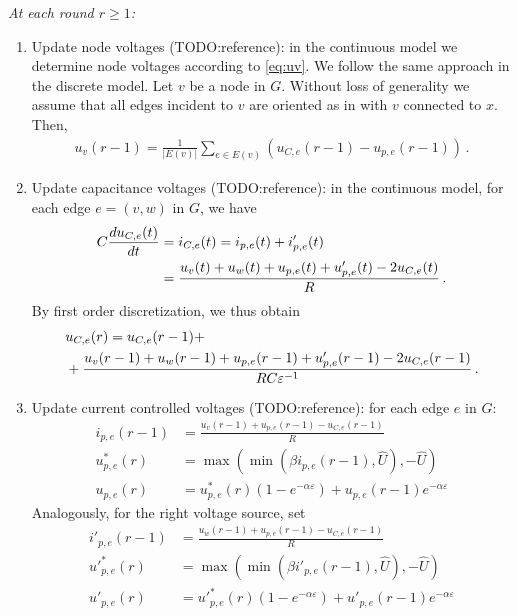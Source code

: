 \noindent
{\em At each round $r \ge 1$:}
\begin{enumerate}
\item Update node voltages (TODO:reference): in the continuous model we determine node voltages according to \eqref{eq:uv}.
We follow the same approach in the discrete model.
Let $v$ be a node in $G$. Without loss of generality we assume that all edges incident to $v$ are oriented as in  with $v$ connected to $x$.
Then,
\begin{align}
u_v(r-1) = \frac{1}{|E(v)|}\sum_{e \in E(v)}(u_{C,e}(r-1)-u_{p,e}(r-1))\,.\label{eq:dis:u}
\end{align}

\item Update capacitance voltages (TODO:reference): in the continuous model, for each edge $e=(v,w)$ in $G$, we have
\begin{align}
  C\frac{d u_{C,e}(t)}{dt} &= i_{C,e}(t) = i_{p,e}(t) + i'_{p,e}(t)\notag\\
  &= \frac{u_v(t)+u_w(t)+u_{p,e}(t)+u'_{p,e}(t)-2u_{C,e}(t)}{R}\,.
\end{align}
By first order discretization, we thus obtain
\begin{align}
  &u_{C,e}(r) = u_{C,e}(r-1) +\notag\\
  &+\frac{u_v(r-1)+u_w(r-1)+u_{p,e}(r-1)+u'_{p,e}(r-1)-2u_{C,e}(r-1)}{RC\varepsilon^{-1}}\,.\label{eq:dis:uC}
\end{align}

\item Update current controlled voltages (TODO:reference): for each edge $e$ in $G$:
\begin{align}
i_{p,e}(r-1) &= \frac{u_v(r-1)+u_{p,e}(r-1)-u_{C,e}(r-1)}{R}\\  
u^*_{p,e}(r) &= \max(\min(\beta i_{p,e}(r-1),\hat{U}),-\hat{U})\\
u_{p,e}(r)   &= u^*_{p,e}(r)(1-e^{-\alpha \varepsilon})+ u_{p,e}(r-1)e^{-\alpha \varepsilon}
\end{align}
Analogously, for the right voltage source, set
\begin{align}
i'_{p,e}(r-1) &= \frac{u_w(r-1)+u_{p,e}(r-1)-u_{C,e}(r-1)}{R}\\  
{u'}^*_{p,e}(r) &= \max(\min(\beta i'_{p,e}(r-1),\hat{U}),-\hat{U})\\
u'_{p,e}(r)   &= {u'}^*_{p,e}(r)(1-e^{-\alpha \varepsilon})+ u'_{p,e}(r-1)e^{-\alpha \varepsilon}
\end{align}

\end{enumerate}

